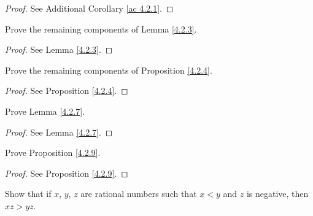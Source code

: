\begin{proof}
    See Additional Corollary \ref{ac 4.2.1}.
\end{proof}

\begin{exercise}\label{ex 4.2.2}
    Prove the remaining components of Lemma \ref{4.2.3}.
\end{exercise}

\begin{proof}
    See Lemma \ref{4.2.3}.
\end{proof}

\begin{exercise}\label{ex 4.2.3}
    Prove the remaining components of Proposition \ref{4.2.4}.
\end{exercise}

\begin{proof}
    See Proposition \ref{4.2.4}.
\end{proof}

\begin{exercise}\label{ex 4.2.4}
    Prove Lemma \ref{4.2.7}.
\end{exercise}

\begin{proof}
    See Lemma \ref{4.2.7}.
\end{proof}

\begin{exercise}\label{ex 4.2.5}
    Prove Proposition \ref{4.2.9}.
\end{exercise}

\begin{proof}
    See Proposition \ref{4.2.9}.
\end{proof}

\begin{exercise}\label{ex 4.2.6}
    Show that if \(x\), \(y\), \(z\) are rational numbers such that \(x < y\) and \(z\) is negative, then \(xz > yz\).
\end{exercise}

